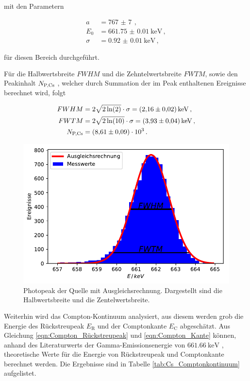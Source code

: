 mit den Parametern

\begin{align*}
  a &= \SI{767(7)}{} \, , \\
  E_0 &= \SI{661.75(1)}{\kilo\electronvolt} \, , \\
  \sigma &= \SI{0.92(1)}{\kilo\electronvolt} \, ,
\end{align*}

für diesen Bereich durchgeführt.

Für die Halbwertsbreite $FWHM$ und die Zehntelwertsbreite $FWTM$, sowie den Peakinhalt $N_\text{P,\ce{Cs}}$ , welcher durch Summation der im Peak enthaltenen Ereignisse berechnet wird, folgt

\begin{align*}
  FWHM &= 2 \sqrt{2 \ln(2)} \cdot \sigma= \SI{2.16(2)}{\kilo\electronvolt} \, , \\
  FWTM &= 2 \sqrt{2 \ln(10)} \cdot \sigma= \SI{3.93(4)}{\kilo\electronvolt} \, , \\
  N_\text{P,\ce{Cs}} &= \SI{8.61(9)e3}{} \, .
\end{align*}

\begin{figure}[H]
  \centering
  \includegraphics[width = .7\textwidth]{../Plots/Cs_Photopeak.pdf}
  \caption{Photopeak der  Quelle mit Ausgleichsrechnung. Dargestellt sind die Halbwertsbreite und die Zentelwertsbreite.}
  \label{fig:Cs_Photo}
\end{figure}

Weiterhin wird das Compton-Kontinuum analysiert, aus diesem werden grob die Energie des Rückstreupeak $E_\text{R}$ und der Comptonkante $E_\text{C}$ abgeschätzt. Aus Gleichung \eqref{eqn:Compton_Rückstreupeak} und \eqref{eqn:Compton_Kante} können,
anhand des Literaturwerts der Gamma-Emissionsenergie von $\SI{661.66}{\kilo\electronvolt}$ \cite{Cs_Emissionsenergie},
theoretische Werte für die Energie von Rückstreupeak und Comptonkante berechnet werden.
Die Ergebnisse sind in Tabelle \ref{tab:Cs_Comptonkontinuum} aufgelistet.

